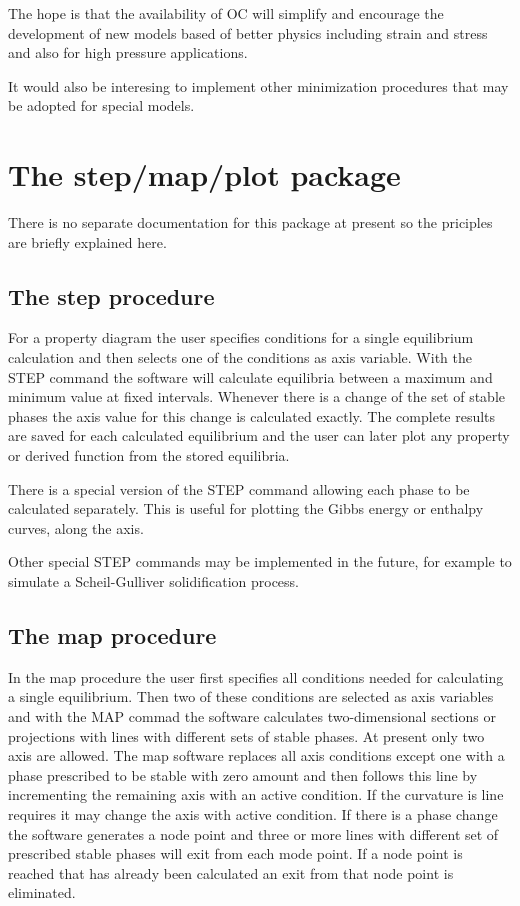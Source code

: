 \documentclass[12pt]{article}
\begin{document}
The hope is that the availability of OC will simplify and encourage
the development of new models based of better physics including strain
and stress and also for high pressure applications.

It would also be interesing to implement other minimization procedures
that may be adopted for special models.

\section{The step/map/plot package}

There is no separate documentation for this package at present so the
priciples are briefly explained here.

\subsection{The step procedure}

For a property diagram the user specifies conditions for a single
equilibrium calculation and then selects one of the conditions as axis
variable.  With the STEP command the software will calculate
equilibria between a maximum and minimum value at fixed intervals.
Whenever there is a change of the set of stable phases the axis value
for this change is calculated exactly.  The complete results are saved
for each calculated equilibrium and the user can later plot any
property or derived function from the stored equilibria.

There is a special version of the STEP command allowing each phase to
be calculated separately.  This is useful for plotting the Gibbs
energy or enthalpy curves, along the axis.

Other special STEP commands may be implemented in the future, for
example to simulate a Scheil-Gulliver solidification process.

\subsection{The map procedure}

In the map procedure the user first specifies all conditions needed
for calculating a single equilibrium.  Then two of these conditions
are selected as axis variables and with the MAP commad the software
calculates two-dimensional sections or projections with lines with
different sets of stable phases.  At present only two axis are
allowed.  The map software replaces all axis conditions except one
with a phase prescribed to be stable with zero amount and then follows
this line by incrementing the remaining axis with an active condition.
If the curvature is line requires it may change the axis with active
condition.  If there is a phase change the software generates a node
point and three or more lines with different set of prescribed stable
phases will exit from each mode point.  If a node point is reached
that has already been calculated an exit from that node point is
eliminated.
\end{document}
